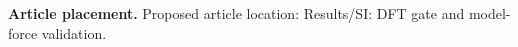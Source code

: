 \textbf{Article placement.} Proposed article location: Results/SI: DFT gate and model-force validation.
